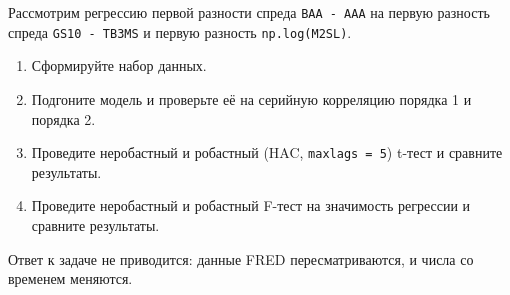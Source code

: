 \documentclass[
  russian,
]{article}
\providecommand{\tightlist}{%
  \setlength{\itemsep}{0pt}\setlength{\parskip}{0pt}}
\begin{document}
Рассмотрим регрессию первой разности спреда \texttt{BAA\ -\ AAA} на
первую разность спреда \texttt{GS10\ -\ TB3MS} и первую разность
\texttt{np.log(M2SL)}.

\begin{enumerate}
\def\labelenumi{\arabic{enumi}.}
\tightlist
\item
  Сформируйте набор данных.
\item
  Подгоните модель и проверьте её на серийную корреляцию порядка 1 и
  порядка 2.
\item
  Проведите неробастный и робастный (HAC, \texttt{maxlags\ =\ 5}) t-тест
  и сравните результаты.
\item
  Проведите неробастный и робастный F-тест на значимость регрессии и
  сравните результаты.
\end{enumerate}

Ответ к задаче не приводится: данные FRED пересматриваются, и числа со
временем меняются.
\end{document}
